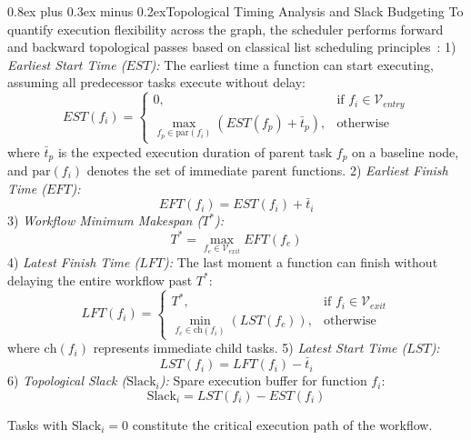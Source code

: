 \documentclass[conference]{IEEEtran}
\makeatletter
\def\subsection{\@startsection{subsection}{2}{\z@}{1.8ex plus 0.8ex minus 0.4ex}%
{0.8ex plus 0.3ex minus 0.2ex}{\normalfont\normalsize\bfseries\color{slateheader}}}
\makeatother
\begin{document}
\subsection{Topological Timing Analysis and Slack Budgeting}
To quantify execution flexibility across the graph, the scheduler performs forward and backward topological passes based on classical list scheduling principles~\cite{topcuoglu2002heft}:
1) \textit{Earliest Start Time ($EST$):} The earliest time a function can start executing, assuming all predecessor tasks execute without delay:
\begin{equation}
EST(f_i) = \begin{cases} 
0, & \text{if } f_i \in \mathcal{V}_{entry} \\ 
\max\limits_{f_p \in \text{par}(f_i)} (EST(f_p) + \bar{t}_p), & \text{otherwise} 
\end{cases}
\end{equation}
where $\bar{t}_p$ is the expected execution duration of parent task $f_p$ on a baseline node, and $\text{par}(f_i)$ denotes the set of immediate parent functions.
2) \textit{Earliest Finish Time ($EFT$):}
\begin{equation}
EFT(f_i) = EST(f_i) + \bar{t}_i
\end{equation}
3) \textit{Workflow Minimum Makespan ($T^*$):}
\begin{equation}
T^* = \max_{f_e \in \mathcal{V}_{exit}} EFT(f_e)
\end{equation}
4) \textit{Latest Finish Time ($LFT$):} The last moment a function can finish without delaying the entire workflow past $T^*$:
\begin{equation}
LFT(f_i) = \begin{cases} 
T^*, & \text{if } f_i \in \mathcal{V}_{exit} \\ 
\min\limits_{f_c \in \text{ch}(f_i)} (LST(f_c)), & \text{otherwise} 
\end{cases}
\end{equation}
where $\text{ch}(f_i)$ represents immediate child tasks.
5) \textit{Latest Start Time ($LST$):}
\begin{equation}
LST(f_i) = LFT(f_i) - \bar{t}_i
\end{equation}
6) \textit{Topological Slack ($\text{Slack}_i$):} Spare execution buffer for function $f_i$:
\begin{equation}
\text{Slack}_i = LST(f_i) - EST(f_i)
\end{equation}

Tasks with $\text{Slack}_i = 0$ constitute the critical execution path of the workflow.
\end{document}
